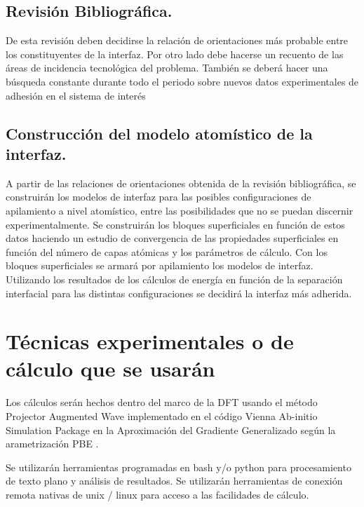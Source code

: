 
\subsection{ Revisión Bibliográfica. }

De esta revisión deben decidirse la relación de orientaciones más probable 
entre los constituyentes de la interfaz. Por otro lado debe hacerse un recuento 
de las áreas de incidencia tecnológica del problema. También se deberá hacer 
una búsqueda constante durante todo el periodo sobre nuevos datos 
experimentales de adhesión en el sistema de interés

\subsection{ Construcción del modelo atomístico de la interfaz.}

A partir de las relaciones de orientaciones obtenida de la revisión 
bibliográfica, se construirán los modelos de interfaz para las posibles 
configuraciones de apilamiento a nivel atomístico, entre las posibilidades que 
no se puedan discernir experimentalmente. Se construirán los bloques 
superficiales en función de estos datos haciendo un estudio de convergencia de 
las propiedades superficiales en función del número de capas atómicas y los 
parámetros de cálculo. Con los bloques superficiales se armará por apilamiento 
los modelos de interfaz. Utilizando los resultados de los cálculos de energía 
en función de la separación interfacial para las distintas configuraciones 
\cite{Jiangetal} 
se decidirá la interfaz más adherida.

\section{Técnicas experimentales o de cálculo que se usarán}

Los cálculos serán hechos dentro del marco de la DFT \cite{KohnSham65,
HohenbergKohn64} usando el método 
Projector Augmented Wave\cite{Bloch1994,Kresse1999}
implementado en el código Vienna Ab-initio 
Simulation Package\cite{Hafner2007,Hafner2008}
en la Aproximación del Gradiente Generalizado según la 
arametrización PBE \cite{PBE}. 

Se utilizarán herramientas programadas en bash y/o python para procesamiento de 
texto plano y análisis de resultados. Se utilizarán herramientas de conexión 
remota nativas de unix / linux para acceso a las facilidades de cálculo.

